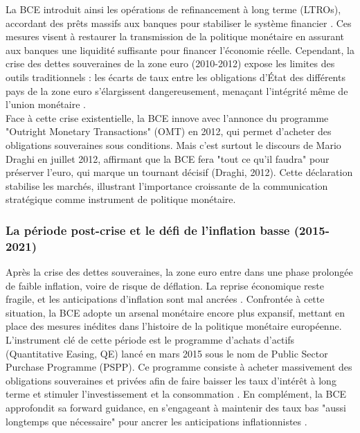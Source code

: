 La BCE introduit ainsi les opérations de refinancement à long terme (LTROs), accordant des prêts massifs aux banques pour stabiliser le système financier \citep{coeuré2013}. Ces mesures visent à restaurer la transmission de la politique monétaire en assurant aux banques une liquidité suffisante pour financer l’économie réelle. Cependant, la crise des dettes souveraines de la zone euro (2010-2012) expose les limites des outils traditionnels : les écarts de taux entre les obligations d’État des différents pays de la zone euro s’élargissent dangereusement, menaçant l’intégrité même de l’union monétaire \citep{degrauwe2012}.\\

Face à cette crise existentielle, la BCE innove avec l’annonce du programme "Outright Monetary Transactions" (OMT) en 2012, qui permet d’acheter des obligations souveraines sous conditions. Mais c’est surtout le discours de Mario Draghi en juillet 2012, affirmant que la BCE fera "tout ce qu’il faudra" pour préserver l’euro, qui marque un tournant décisif (Draghi, 2012). Cette déclaration stabilise les marchés, illustrant l’importance croissante de la communication stratégique comme instrument de politique monétaire.

\subsubsection{La période post-crise et le défi de l’inflation basse (2015-2021)}

Après la crise des dettes souveraines, la zone euro entre dans une phase prolongée de faible inflation, voire de risque de déflation. La reprise économique reste fragile, et les anticipations d’inflation sont mal ancrées \citep{blanchard2015}. Confrontée à cette situation, la BCE adopte un arsenal monétaire encore plus expansif, mettant en place des mesures inédites dans l’histoire de la politique monétaire européenne.\\

L’instrument clé de cette période est le programme d’achats d’actifs (Quantitative Easing, QE) lancé en mars 2015 sous le nom de Public Sector Purchase Programme (PSPP). Ce programme consiste à acheter massivement des obligations souveraines et privées afin de faire baisser les taux d’intérêt à long terme et stimuler l’investissement et la consommation \citep{gürkaynak2015}. En complément, la BCE approfondit sa forward guidance, en s’engageant à maintenir des taux bas "aussi longtemps que nécessaire" pour ancrer les anticipations inflationnistes \citep{woodford2012}.\\

